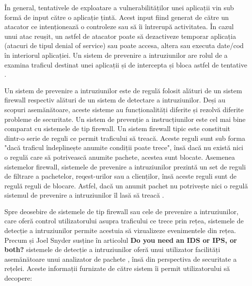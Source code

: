 În general, tentativele de exploatare a vulnerabilităților unei aplicații vin sub formă de input către o aplicație țintă. Acest input fiind generat de către un atacator ce intenționează o controleze sau să îi întrerupă activitatea. În cazul unui atac reușit, un astfel de atacator poate să dezactiveze temporar aplicația (atacuri de tipul denial of service) sau poate accesa, altera sau executa date/cod în interiorul aplicației. Un sistem de prevenire a intruziunilor are rolul de a examina traficul destinat unei aplicații și de intercepta și bloca astfel de tentative  \cite{what_is_ips}.

Un sistem de prevenire a intruziunilor este de regulă folosit alături de un sistem firewall respectiv alături de un sistem de detectare a intruziunilor. Deși au scopuri asemănătoare, aceste sisteme au funcționalități diferite și rezolvă diferite probleme de securitate. Un sistem de prevenție a instrucțiunilor este cel mai bine comparat cu sistemele de tip firewall. Un sistem firewall tipic este constituit dintr-o serie de reguli ce permit traficului să treacă. Aceste reguli sunt sub forma "dacă traficul îndeplinește anumite condiții poate trece", însă dacă nu există nici o regulă care să potrivească anumite pachete, acestea sunt blocate. Asemenea sistemelor firewall, sistemele de prevenire a intruziunilor prezintă un set de reguli de filtrare a pachetelor, reqest-urilor  sau a clienților, însă aceste reguli sunt de regulă reguli de blocare. Astfel, dacă un anumit pachet nu potrivește nici o regulă sistemul de prevenire a intruziunilor îl lasă să treacă  \cite{ips_ids}.

Spre deosebire de sistemele de tip firewall sau cele de prevenire a intruziunilor, care oferă control utilizatorului asupra traficului ce trece prin rețea, sistemele de detecție a intruziunilor permite acestuia să vizualizeze evenimentele din rețea. Precum și Joel Snyder susține în articolul  \textbf{Do you need an IDS or IPS, or both?} \cite{ips_ids}  sistemele  de detecție a intruziunilor oferă unui utilizator facilități asemănătoare unui analizator de pachete  \cite{net_an},  însă din perspectiva de securitate a rețelei. Aceste informații furnizate de către sistem îi permit utilizatorului să decopere:  
 
